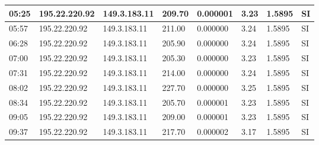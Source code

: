 \begin{table}[H]
\begin{tabular}{|l|l|l|l|l|l|l|l|}
		05:25 & 195.22.220.92 & 149.3.183.11 & 209.70 & 0.000001 & 3.23 & 1.5895 & SI \\ \hline
		05:57 & 195.22.220.92 & 149.3.183.11 & 211.00 & 0.000000 & 3.24 & 1.5895 & SI \\ \hline
		06:28 & 195.22.220.92 & 149.3.183.11 & 205.90 & 0.000000 & 3.24 & 1.5895 & SI \\ \hline
		07:00 & 195.22.220.92 & 149.3.183.11 & 205.30 & 0.000000 & 3.23 & 1.5895 & SI \\ \hline
		07:31 & 195.22.220.92 & 149.3.183.11 & 214.00 & 0.000000 & 3.24 & 1.5895 & SI \\ \hline
		08:02 & 195.22.220.92 & 149.3.183.11 & 227.70 & 0.000000 & 3.25 & 1.5895 & SI \\ \hline
		08:34 & 195.22.220.92 & 149.3.183.11 & 205.70 & 0.000001 & 3.23 & 1.5895 & SI \\ \hline
		09:05 & 195.22.220.92 & 149.3.183.11 & 209.00 & 0.000001 & 3.23 & 1.5895 & SI \\ \hline
		09:37 & 195.22.220.92 & 149.3.183.11 & 217.70 & 0.000002 & 3.17 & 1.5895 & SI \\ \hline
	\end{tabular}
\end{table}

